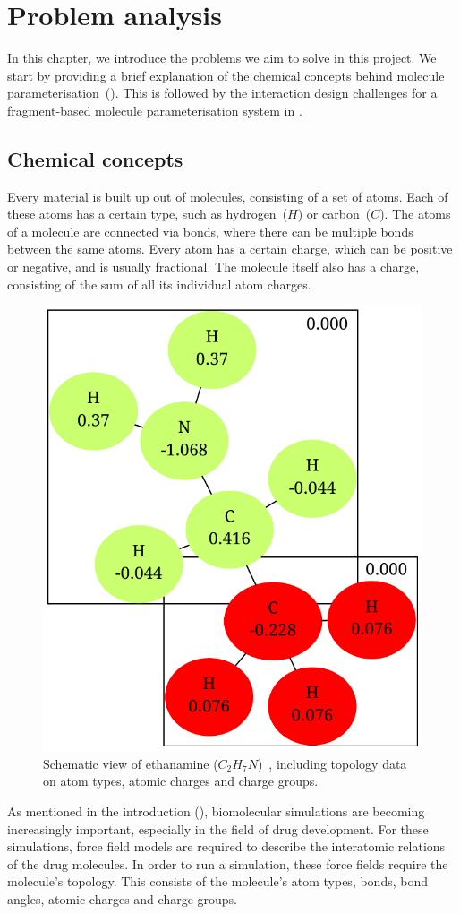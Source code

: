 \chapter{Problem analysis}

In this chapter, we introduce the problems we aim to solve in this project. We start by providing a brief explanation of the chemical concepts behind molecule parameterisation~(). This is followed by the interaction design challenges for a fragment-based molecule parameterisation system in .



\section{Chemical concepts}
Every material is built up out of molecules, consisting of a set of atoms. Each of these atoms has a certain type, such as hydrogen~($H$) or carbon~($C$). The atoms of a molecule are connected via bonds, where there can be multiple bonds between the same atoms. Every atom has a certain charge, which can be positive or negative, and is usually fractional. The molecule itself also has a charge, consisting of the sum of all its individual atom charges.

\begin{figure}
\vspace{-2em}
\begin{center}
\includegraphics[width=.38\textwidth]{img/ethanamine.pdf}
\caption{Schematic view of ethanamine ($C_{2}H_{7}N$)~\cite{atb2014ethanamine}, including topology data on atom types, atomic charges and charge groups.}
\end{center}
\vspace{-2em}
\end{figure}

As mentioned in the introduction (), biomolecular simulations are becoming increasingly important, especially in the field of drug development. For these simulations, force field models are required to describe the interatomic relations of the drug molecules. In order to run a simulation, these force fields require the molecule's topology. This consists of the molecule's atom types, bonds, bond angles, atomic charges and charge groups.

